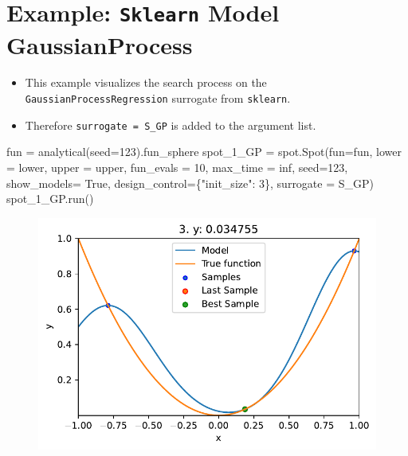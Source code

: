 \documentclass[
  letterpaper,
  DIV=11,
  numbers=noendperiod]{scrreprt}
\newenvironment{Shaded}{\begin{snugshade}}{\end{snugshade}}
\newcommand{\DecValTok}[1]{\textcolor[rgb]{0.68,0.00,0.00}{#1}}
\newcommand{\NormalTok}[1]{\textcolor[rgb]{0.00,0.23,0.31}{#1}}
\newcommand{\OperatorTok}[1]{\textcolor[rgb]{0.37,0.37,0.37}{#1}}
\newcommand{\StringTok}[1]{\textcolor[rgb]{0.13,0.47,0.30}{#1}}
\newcommand{\VariableTok}[1]{\textcolor[rgb]{0.07,0.07,0.07}{#1}}
\providecommand{\tightlist}{%
  \setlength{\itemsep}{0pt}\setlength{\parskip}{0pt}}\usepackage{longtable,booktabs,array}
\begin{document}
\hypertarget{example-sklearn-model-gaussianprocess}{%
\section{\texorpdfstring{Example: \texttt{Sklearn} Model
GaussianProcess}{Example: Sklearn Model GaussianProcess}}\label{example-sklearn-model-gaussianprocess}}

\begin{itemize}
\tightlist
\item
  This example visualizes the search process on the
  \texttt{GaussianProcessRegression} surrogate from \texttt{sklearn}.
\item
  Therefore \texttt{surrogate\ =\ S\_GP} is added to the argument list.
\end{itemize}

\begin{Shaded}
\begin{Highlighting}[]
\NormalTok{fun }\OperatorTok{=}\NormalTok{ analytical(seed}\OperatorTok{=}\DecValTok{123}\NormalTok{).fun\_sphere}
\NormalTok{spot\_1\_GP }\OperatorTok{=}\NormalTok{ spot.Spot(fun}\OperatorTok{=}\NormalTok{fun,}
\NormalTok{                   lower }\OperatorTok{=}\NormalTok{ lower,}
\NormalTok{                   upper }\OperatorTok{=}\NormalTok{ upper,}
\NormalTok{                   fun\_evals }\OperatorTok{=} \DecValTok{10}\NormalTok{,}
\NormalTok{                   max\_time }\OperatorTok{=}\NormalTok{ inf,}
\NormalTok{                   seed}\OperatorTok{=}\DecValTok{123}\NormalTok{,}
\NormalTok{                   show\_models}\OperatorTok{=} \VariableTok{True}\NormalTok{,}
\NormalTok{                   design\_control}\OperatorTok{=}\NormalTok{\{}\StringTok{"init\_size"}\NormalTok{: }\DecValTok{3}\NormalTok{\},}
\NormalTok{                   surrogate }\OperatorTok{=}\NormalTok{ S\_GP)}
\NormalTok{spot\_1\_GP.run()}
\end{Highlighting}
\end{Shaded}

\begin{figure}[H]

{\centering \includegraphics{04_spot_sklearn_surrogate_files/figure-pdf/cell-25-output-1.pdf}

}

\end{figure}
\end{document}
